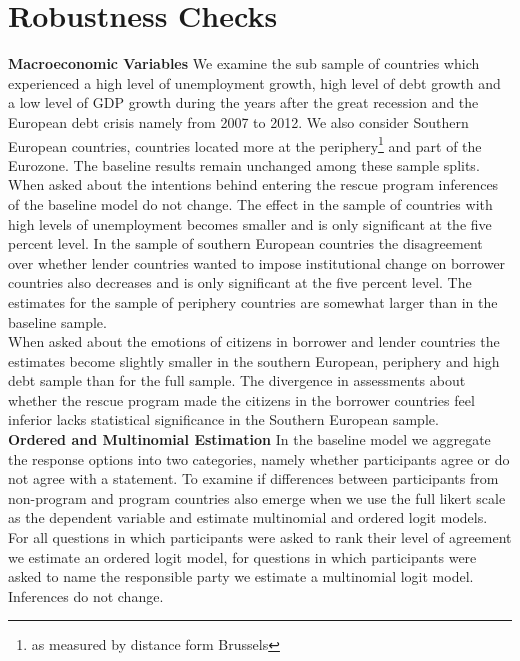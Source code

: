 \section{Robustness Checks}
\textbf{Macroeconomic Variables}  We examine the sub sample of countries which experienced a high level of unemployment growth, high level of debt growth and a low level of GDP growth during the years after the great recession and the European debt crisis namely from 2007 to 2012. We also consider Southern European countries, countries located more at the periphery\footnote{as measured by distance form Brussels} and part of the Eurozone. The baseline results remain unchanged among these sample splits. When asked about the intentions behind entering the rescue program inferences of the baseline model do not change. The effect in the sample of countries with high levels of unemployment becomes smaller and is only significant at the five percent level. In the sample of southern European countries the disagreement over whether lender countries wanted to impose institutional change on borrower countries also decreases and is only significant at the five percent level. The estimates for the sample of periphery countries are somewhat larger than in the baseline sample.\\
When asked about the emotions of citizens in borrower and lender countries the estimates become slightly smaller in the southern European, periphery and high debt sample than for the full sample. The divergence in assessments about whether the rescue program made the citizens in the borrower countries feel inferior lacks statistical significance in the Southern European sample. %
\\

\textbf{Ordered and Multinomial Estimation}
In the baseline model we aggregate the response options into two categories, namely whether participants agree or do not agree with a statement.  To examine if differences between participants from non-program and program countries also emerge when we use the full likert scale as the dependent variable and estimate multinomial and ordered logit models. For all questions in which participants were asked to rank their level of agreement we estimate an ordered logit model, for questions in which participants were asked to name the responsible party we estimate a multinomial logit model. Inferences do not change.\\

